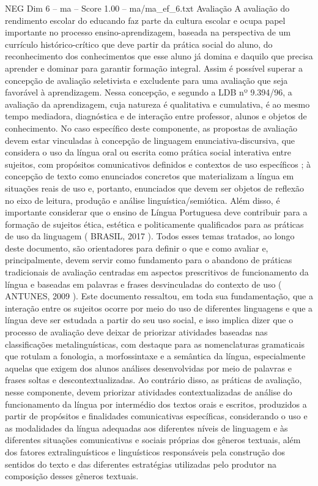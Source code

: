 \begin{textsample}{NEG Dim 6 – ma – Score 1.00 – ma/ma\_ef\_6.txt}  \label{ex:f6_neg_196}
Avaliação A avaliação do rendimento escolar do educando faz parte da cultura escolar e ocupa papel importante no processo ensino-aprendizagem, baseada na perspectiva de um currículo histórico-crítico que deve partir da prática social do aluno, do reconhecimento dos conhecimentos que esse aluno já domina e daquilo que precisa aprender e dominar para garantir formação integral.
Assim é possível superar a concepção de avaliação seletivista e excludente para uma avaliação que seja favorável à aprendizagem.
Nessa concepção, e segundo a LDB nº 9.394/96, a avaliação da aprendizagem, cuja natureza é qualitativa e cumulativa, é ao mesmo tempo mediadora, diagnóstica e de interação entre professor, alunos e objetos de conhecimento.
No caso específico deste componente, as propostas de avaliação devem estar vinculadas à concepção de linguagem enunciativa-discursiva, que considera o uso da língua oral ou escrita como prática social interativa entre sujeitos, com propósitos comunicativos definidos e contextos de uso específicos ; à concepção de texto como enunciados concretos que materializam a língua em situações reais de uso e, portanto, enunciados que devem ser objetos de reflexão no eixo de leitura, produção e análise linguística/semiótica.
Além disso, é importante considerar que o ensino de Língua Portuguesa deve contribuir para a formação de sujeitos ética, estética e politicamente qualificados para as práticas de uso da linguagem ( BRASIL, 2017 ).
Todos esses temas tratados, ao longo deste documento, são orientadores para definir o que e como avaliar e, principalmente, devem servir como fundamento para o abandono de práticas tradicionais de avaliação centradas em aspectos prescritivos de funcionamento da língua e baseadas em palavras e frases desvinculadas do contexto de uso ( ANTUNES, 2009 ).
Este documento ressaltou, em toda sua fundamentação, que a interação entre os sujeitos ocorre por meio do uso de diferentes linguagens e que a língua deve ser estudada a partir do seu uso social, e isso implica dizer que o processo de avaliação deve deixar de priorizar atividades baseadas nas classificações metalinguísticas, com destaque para as nomenclaturas gramaticais que rotulam a fonologia, a morfossintaxe e a semântica da língua, especialmente aquelas que exigem dos alunos análises desenvolvidas por meio de palavras e frases soltas e descontextualizadas.
Ao contrário disso, as práticas de avaliação, nesse componente, devem priorizar atividades contextualizadas de análise do funcionamento da língua por intermédio dos textos orais e escritos, produzidos a partir de propósitos e finalidades comunicativas específicas, considerando o uso e as modalidades da língua adequadas aos diferentes níveis de linguagem e às diferentes situações comunicativas e sociais próprias dos gêneros textuais, além dos fatores extralinguísticos e linguísticos responsáveis pela construção dos sentidos do texto e das diferentes estratégias utilizadas pelo produtor na composição desses gêneros textuais.

\end{textsample}
